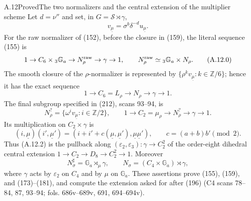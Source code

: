 \begin{statement}{A.12}{Proved}{The two normalizers and the central extension of the multiplier scheme}
Let $d=\nu''$ and set, in $G=\mathcal S\rtimes\gamma$,
\[
 v_{\underline\mu}=\sigma^b\delta^{-d}u_{\underline\mu}.
\]
For the raw normalizer of (152), before the closure in (159),
the literal sequence (155) is
\[
 1\to C_6\times{}_3\mathbb G_a\to N_\rho^{\rm raw}
   \to\gamma\to1,
 \qquad N_\rho^{\rm raw}\simeq{}_3\mathbb G_a\times N_\rho.
                                                               \tag{A.12.0}
\]
The smooth closure of the $\rho$-normalizer is represented by
$\{\rho^k v_{\underline\mu}:k\in\mathbb Z/6\}$; hence it has the
exact sequence
\[
 1\to C_6=L_\rho\to N_\rho\to\gamma\to1.          \tag{A.12.1}
\]
The final subgroup specified in (212), scans 93--94, is
\[
 N_\rho^?=\{\omega^i v_{\underline\mu}:i\in\mathbb Z/2\},
 \qquad 1\to C_2=\mu_\rho\to N_\rho^?\to\gamma\to1. \tag{A.12.2}
\]
Its multiplication on $C_2\times\gamma$ is
\[
 (i,\underline\mu)(i',\underline\mu')
  =(i+i'+c(\underline\mu,\underline\mu'),
       \underline\mu\underline\mu'),\qquad
 c=(a+b)b'\pmod2.                                 \tag{A.12.3}
\]
Thus (A.12.2) is the pullback along
$(\varepsilon_2,\varepsilon_3):\gamma\to C_2^2$ of the order-eight
dihedral central extension $1\to C_2\to D_8\to C_2^2\to1$.
Moreover
\[
 N_\sigma^\sharp=\mathbb G_a\rtimes_\mu\gamma,\qquad
 N_\sigma=(C_4\times\mathbb G_a)\rtimes\gamma,       \tag{A.12.4}
\]
where $\gamma$ acts by $\varepsilon_2$ on $C_4$ and by $\mu$ on
$\mathbb G_a$. These assertions prove (155), (159), and (173)--(181),
and compute the extension asked for after (196)
(C4 scans 78--84, 87, 93--94; fols. 686v--689v, 691, 694--694v).
\end{statement}
